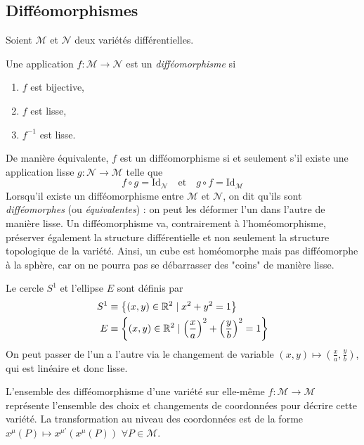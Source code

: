 \subsection{Difféomorphismes}
Soient $\mathcal{M}$ et $\mathcal{N}$ deux variétés différentielles. 
\begin{theoremframe}
    \begin{defi}
        Une application $f:\mathcal{M} \to \mathcal{N}$ est un \emph{difféomorphisme} si 
        \begin{enumerate}[label = \roman*.]
            \item $f$ est bijective,
            \item $f$ est lisse,
            \item $f^{-1}$ est lisse.
        \end{enumerate}
    \end{defi}
\end{theoremframe}
De manière équivalente, $f$ est un difféomorphisme si et seulement s'il existe une application lisse $g: \mathcal{N} \to \mathcal{M}$ telle que 
\begin{equation}
    f \circ g = \mathrm{Id}_\mathcal{N} \quad \text{et} \quad g \circ f = \mathrm{Id}_\mathcal{M}
\end{equation}
Lorsqu'il existe un difféomorphisme entre $\mathcal{M}$ et $\mathcal{N}$, on dit qu'ils sont \emph{difféomorphes} (ou \emph{équivalentes}) : on peut les déformer l'un dans l'autre de manière lisse. Un difféomorphisme va, contrairement à l'homéomorphisme, préserver également la structure différentielle et non seulement la structure topologique de la variété. Ainsi, un cube est homéomorphe mais pas difféomorphe à la sphère, car on ne pourra pas se débarrasser des "coins" de manière lisse.

\begin{exmp}
    Le cercle $S^1$ et l'ellipse $E$ sont définis par
    \begin{align}
        S^1 &\equiv \left\{ (x,y) \in \mathbb{R}^2 \mid x^2+y^2 = 1\right\} \\
        E &\equiv \left\{ (x,y) \in \mathbb{R}^2 \mid \left( \frac{x}{a} \right)^2 + \left( \frac{y}{b} \right)^2 = 1\right\}
    \end{align}
    On peut passer de l'un a l'autre via le changement de variable $(x, y) \mapsto (\frac{x}{a}, \frac{y}{b})$, qui est linéaire et donc lisse. 
\end{exmp}

L'ensemble des difféomorphisme d'une variété sur elle-même $f: \mathcal{M} \to \mathcal{M}$ représente l'ensemble des choix et changements de coordonnées pour décrire cette variété. La transformation au niveau des coordonnées est de la forme $x^{\mu}(P) \mapsto x^{\mu'}(x^\mu(P))$ $\forall P \in \mathcal{M}$. 

